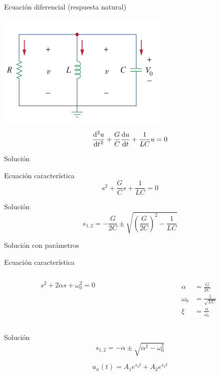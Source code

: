 \documentclass[aspectratio=169, usenames,svgnames,dvipsnames]{beamer}
\begin{document}
\begin{frame}[label={sec:org42ee1f6}]{Ecuación diferencial (respuesta natural)}
\begin{center}
\includegraphics[height=0.6\textheight]{../figs/RLC_paralelo0.pdf}
\end{center}

\[
  \diff[2]{u}{t} + \frac{G}{C} \diff{u}{t} + \frac{1}{LC} u = 0
\]
\end{frame}

\begin{frame}[label={sec:org44b6729}]{Solución}
\begin{block}{Ecuación característica}
\[
s^2 + \frac{G}{C} s + \frac{1}{LC} = 0  
\]
\end{block}

\begin{block}{Solución}
\[
  s_{1,2} = -\frac{G}{2C} \pm \sqrt{\left(\frac{G}{2C}\right)^2 - \frac{1}{LC}}
\]
\end{block}
\end{frame}


\begin{frame}[label={sec:orga253304}]{Solución con parámetros}
\begin{block}{Ecuación característica}
\begin{columns}
\begin{column}{.5\columnwidth}
\[
s^2 + 2\alpha s + \omega_0^2 = 0  
\]
\end{column}
\begin{column}{.5\columnwidth}
\begin{align*}
  \alpha &= \frac{G}{2C}\\
  \omega_0 &= \frac{1}{\sqrt{LC}}\\
  \xi &= \frac{\alpha}{\omega_0}
\end{align*}
\end{column}
\end{columns}
\end{block}

\begin{block}{Solución}
\[
  s_{1,2} = -\alpha \pm \sqrt{\alpha^2 - \omega_0^2}
\]

\[
  u_n(t) = A_1 e^{s_1 t} + A_2 e^{s_2 t}
\]
\end{block}
\end{frame}
\end{document}

